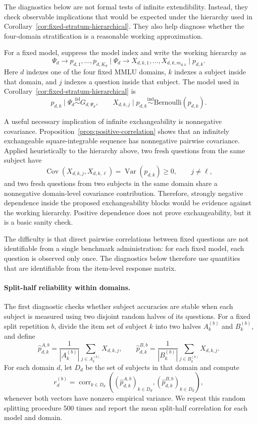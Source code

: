 \documentclass[11pt]{article}
\DeclareMathOperator{\Var}{Var}
\DeclareMathOperator{\Cov}{Cov}
\theoremstyle{definition}
\theoremstyle{remark}
\begin{document}
The diagnostics below are not formal tests of infinite extendibility. Instead, they check observable implications that would be expected under the hierarchy used in Corollary~\ref{cor:fixed-stratum-hierarchical}. They also help diagnose whether the four-domain stratification is a reasonable working approximation.

For a fixed model, suppress the model index and write the working hierarchy as
\[
    \Psi_d
    \longrightarrow
    p_{d,1},\ldots,p_{d,K_d}\mid \Psi_d
    \longrightarrow
    X_{d,k,1},\ldots,X_{d,k,m_{d,k}}\mid p_{d,k}.
\]
Here \(d\) indexes one of the four fixed MMLU domains, \(k\) indexes a subject inside that domain, and \(j\) indexes a question inside that subject.  The model used in Corollary~\ref{cor:fixed-stratum-hierarchical} is
\[
    p_{d,k}\mid \Psi_d
    \stackrel{\mathrm{iid}}{\sim}
    G_{d,\Psi_d},
    \qquad
    X_{d,k,j}\mid p_{d,k}
    \stackrel{\mathrm{ind}}{\sim}
    \mathrm{Bernoulli}(p_{d,k}).
\]

A useful necessary implication of infinite exchangeability is nonnegative covariance.  Proposition~\ref{prop:positive-correlation} shows that an infinitely exchangeable square-integrable sequence has nonnegative pairwise covariance.  Applied heuristically to the hierarchy above, two fresh questions from the same subject have
\[
    \Cov(X_{d,k,j},X_{d,k,\ell})
    =
    \Var(p_{d,k})
    \ge 0,
    \qquad j\ne \ell,
\]
and two fresh questions from two subjects in the same domain share a nonnegative domain-level covariance contribution. Therefore, strongly negative dependence inside the proposed exchangeability blocks would be evidence against the working hierarchy. Positive dependence does not prove exchangeability, but it is a basic sanity check.

The difficulty is that direct pairwise correlations between fixed questions are not identifiable from a single benchmark administration: for each fixed model, each question is observed only once.  The diagnostics below therefore use quantities that are identifiable from the item-level response matrix.

\paragraph{Split-half reliability within domains.}

The first diagnostic checks whether subject accuracies are stable when each subject is measured using two disjoint random halves of its questions.  For a fixed split repetition \(b\), divide the item set of subject \(k\) into two halves \(A_k^{(b)}\) and \(B_k^{(b)}\), and define
\[
    \hat p_{d,k}^{A,b}
    =
    \frac1{|A_k^{(b)}|}
    \sum_{j\in A_k^{(b)}} X_{d,k,j},
    \qquad
    \hat p_{d,k}^{B,b}
    =
    \frac1{|B_k^{(b)}|}
    \sum_{j\in B_k^{(b)}} X_{d,k,j}.
\]
For each domain \(d\), let \(D_d\) be the set of subjects in that domain and compute
\[
    r_d^{(b)}
    =
    \operatorname{corr}_{k\in D_d}
    \left(
        (\hat p_{d,k}^{A,b})_{k\in D_d},
        (\hat p_{d,k}^{B,b})_{k\in D_d}
    \right),
\]
whenever both vectors have nonzero empirical variance.  We repeat this random splitting procedure 500 times and report the mean split-half correlation for each model and domain.
\end{document}
